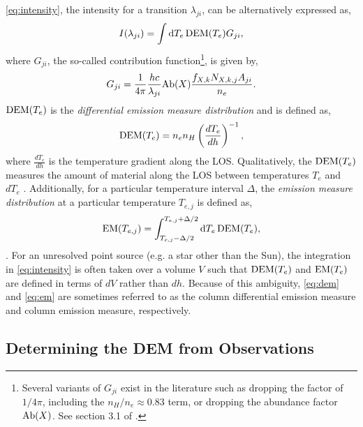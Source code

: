 \autoref{eq:intensity}, the intensity for a transition $\lambda_{ji}$, can be alternatively expressed as,
\begin{equation}\label{eq:intensity_dem}
    I(\lambda_{ji}) = \int\dd{T_e}\dem G_{ji},
\end{equation}
where $G_{ji}$, the so-called contribution function\footnote{Several variants of $G_{ji}$ exist in the literature such as dropping the factor of $1/4\pi$, including the $n_H/n_e\approx0.83$ term, or dropping the abundance factor $\textup{Ab}(X)$. See section 3.1 of \citet{del_zanna_solar_2018}.}, is given by,
\begin{equation}\label{eq:contribution_function}
    G_{ji} = \frac{1}{4\pi}\frac{hc}{\lambda_{ji}}\textup{Ab}(X)\frac{f_{X,k}N_{X,k,j}A_{ji}}{n_e}.
\end{equation}
$\dem$ is the \textit{differential emission measure distribution} and is defined as,
\begin{equation}\label{eq:dem}
    \dem = n_en_H\left(\frac{dT_e}{dh}\right)^{-1},
\end{equation}
where $\frac{dT_e}{dh}$ is the temperature gradient along the LOS. Qualitatively, the $\dem$ measures the amount of material along the LOS between temperatures $T_e$ and $dT_e$ \citep{withbroe_thermal_1978}. Additionally, for a particular temperature interval $\Delta$, the \textit{emission measure distribution} at a particular temperature $T_{e,j}$ is defined as,
\begin{equation}\label{eq:em}
    \emd[T_{e,j}] = \int_{T_{e,j} - \Delta/2}^{T_{e,j} + \Delta/2}\dd{T_e}\dem,
\end{equation}
\citep{del_zanna_solar_2018}. For an unresolved point source (e.g. a star other than the Sun), the integration in \autoref{eq:intensity} is often taken over a volume $V$ such that $\dem$ and $\emd$ are defined in terms of $dV$ rather than $dh$. Because of this ambiguity, \autoref{eq:dem} and \autoref{eq:em} are sometimes referred to as the column differential emission measure and column emission measure, respectively.

\subsection{Determining the DEM from Observations}

